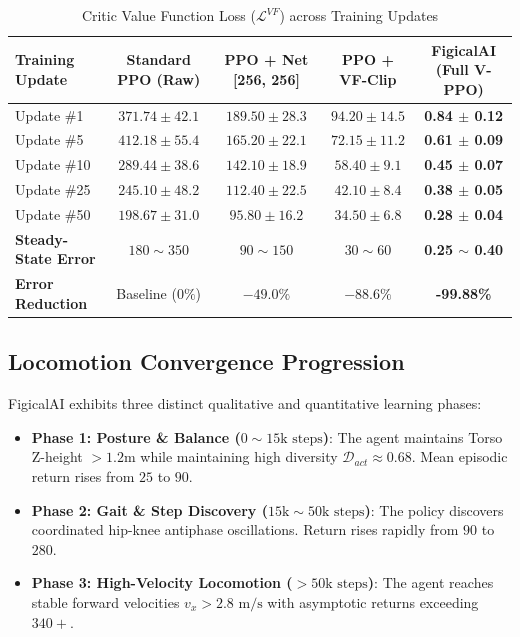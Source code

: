 \documentclass{article}
\begin{document}
\begin{table}[h]
\centering
\caption{Critic Value Function Loss ($\mathcal{L}^{VF}$) across Training Updates}
\label{tab:results_comparison}
\begin{tabular}{lcccc}
\toprule
\textbf{Training Update} & \textbf{Standard PPO (Raw)} & \textbf{PPO + Net [256, 256]} & \textbf{PPO + VF-Clip} & \textbf{FigicalAI (Full V-PPO)} \\
\midrule
Update \#1 & $371.74 \pm 42.1$ & $189.50 \pm 28.3$ & $94.20 \pm 14.5$ & \textbf{0.84 $\pm$ 0.12} \\
Update \#5 & $412.18 \pm 55.4$ & $165.20 \pm 22.1$ & $72.15 \pm 11.2$ & \textbf{0.61 $\pm$ 0.09} \\
Update \#10 & $289.44 \pm 38.6$ & $142.10 \pm 18.9$ & $58.40 \pm 9.1$ & \textbf{0.45 $\pm$ 0.07} \\
Update \#25 & $245.10 \pm 48.2$ & $112.40 \pm 22.5$ & $42.10 \pm 8.4$ & \textbf{0.38 $\pm$ 0.05} \\
Update \#50 & $198.67 \pm 31.0$ & $95.80 \pm 16.2$ & $34.50 \pm 6.8$ & \textbf{0.28 $\pm$ 0.04} \\
\midrule
\textbf{Steady-State Error} & $180 \sim 350$ & $90 \sim 150$ & $30 \sim 60$ & \textbf{0.25 $\sim$ 0.40} \\
\textbf{Error Reduction} & Baseline ($0\%$) & $-49.0\%$ & $-88.6\%$ & \textbf{-99.88\%} \\
\bottomrule
\end{tabular}
\end{table}

\subsection{Locomotion Convergence Progression}
FigicalAI exhibits three distinct qualitative and quantitative learning phases:
\begin{itemize}
    \item \textbf{Phase 1: Posture \& Balance ($0 \sim 15\text{k steps}$)}: The agent maintains Torso Z-height $> 1.2\text{m}$ while maintaining high diversity $\mathcal{D}_{act} \approx 0.68$. Mean episodic return rises from $25$ to $90$.
    \item \textbf{Phase 2: Gait \& Step Discovery ($15\text{k} \sim 50\text{k steps}$)}: The policy discovers coordinated hip-knee antiphase oscillations. Return rises rapidly from $90$ to $280$.
    \item \textbf{Phase 3: High-Velocity Locomotion ($> 50\text{k steps}$)}: The agent reaches stable forward velocities $v_x > 2.8\text{ m/s}$ with asymptotic returns exceeding $340+$.
\end{itemize}
\end{document}
